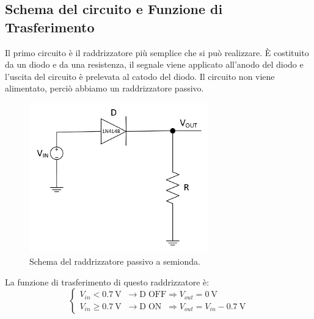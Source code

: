 \documentclass{report}
\begin{document}
\subsection{Schema del circuito e Funzione di Trasferimento}Il primo circuito è il raddrizzatore più semplice che si può realizzare. \`E costituito da un diodo e da una resistenza, il segnale viene applicato all'anodo del diodo e l'uscita del circuito è prelevata al catodo del diodo. Il circuito non viene alimentato, perciò abbiamo un raddrizzatore passivo. \par
\begin{figure}[h]
	\centering
	\includegraphics[height=6.5cm]{immagini/schema1}
	\caption{Schema del raddrizzatore passivo a semionda.}
	\label{figura:schema1}
\end{figure}
\noindent La funzione di trasferimento di questo raddrizzatore è:
\begin{equation}
   \begin{cases}
   V_{in}< \SI{0.7}{\volt}\;\;\rightarrow \mathrm{D\;OFF} \Rightarrow V_{out} =\SI{0}{\volt}\\
   V_{in}\ge \SI{0.7}{\volt}\;\;\rightarrow \mathrm{D\;ON}\;\; \Rightarrow V_{out} = V_{in}-\SI{0.7}{\volt}
   \end{cases}
\end{equation}
\end{document}
